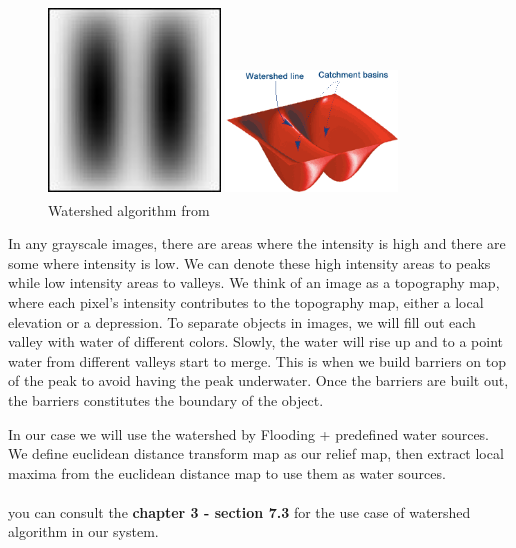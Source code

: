 \begin{figure}[H]
\centering
\begin{minipage}{.33\textwidth}
  \centering
  \centerline{\includegraphics[width = 1.8in]{../images/watershed_example.jpg}}
\end{minipage}

\begin{minipage}{.33\textwidth}
  \centering
  \centerline{\includegraphics[width = 1.8in]{../images/watershed_relief.png}}
\end{minipage}
  \caption{Watershed algorithm from \textsuperscript{\cite{Steve_Eddins_2022_mathworks}}}
\end{figure}

In any grayscale images, there are areas where the intensity is high and there are some where intensity is low. We can denote these high intensity areas to peaks while low intensity areas to valleys. We think of an image as a topography map, where each pixel’s intensity contributes to the topography map, either a local elevation or a depression. To separate objects in images, we will fill out each valley with water of different colors. Slowly, the water will rise up and to a point water from different valleys start to merge. This is when we build barriers on top of the peak to avoid having the peak underwater. Once the barriers are built out, the barriers constitutes the boundary of the object.

In our case we will use the watershed by Flooding + predefined water sources.
We define euclidean distance transform map as our relief map, then extract local maxima from the euclidean distance map to use them as water sources.
\\\\
you can consult the \textbf{chapter 3 - section 7.3} for the use case of watershed algorithm in our system.

